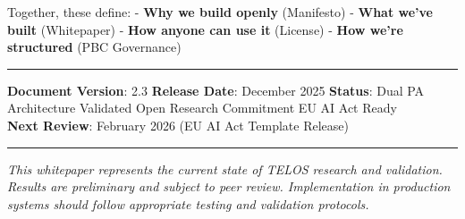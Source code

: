 Together, these define: - \textbf{Why we build openly} (Manifesto) -
\textbf{What we've built} (Whitepaper) - \textbf{How anyone can use it}
(License) - \textbf{How we're structured} (PBC Governance)

\begin{center}\rule{0.5\linewidth}{0.5pt}\end{center}

\textbf{Document Version}: 2.3 \textbf{Release Date}: December 2025
\textbf{Status}: Dual PA Architecture Validated \textbar{} Open Research
Commitment \textbar{} EU AI Act Ready\\
\textbf{Next Review}: February 2026 (EU AI Act Template Release)

\begin{center}\rule{0.5\linewidth}{0.5pt}\end{center}

\emph{This whitepaper represents the current state of TELOS research and
validation. Results are preliminary and subject to peer review.
Implementation in production systems should follow appropriate testing
and validation protocols.}
